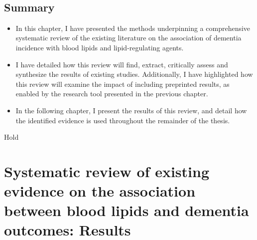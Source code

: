 \documentclass[a4paper, twoside]{templates/ociamthesis}
\begin{document}
~

\hypertarget{summary-2}{%
\section{Summary}\label{summary-2}}

\begin{itemize}
\item
  In this chapter, I have presented the methods underpinning a comprehensive systematic review of the existing literature on the association of dementia incidence with blood lipids and lipid-regulating agents.
\item
  I have detailed how this review will find, extract, critically assess and synthesize the results of existing studies. Additionally, I have highlighted how this review will examine the impact of including preprinted results, as enabled by the research tool presented in the previous chapter.
\item
  In the following chapter, I present the results of this review, and detail how the identified evidence is used throughout the remainder of the thesis.
\end{itemize}

\begin{savequote}
Hold
\end{savequote}



\hypertarget{sys-rev-results-heading}{%
\chapter{Systematic review of existing evidence on the association between blood lipids and dementia outcomes: Results}\label{sys-rev-results-heading}}

~

\minitoc 
\end{document}
